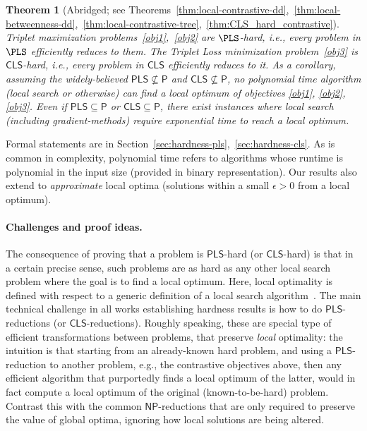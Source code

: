 \documentclass{article}
\theoremstyle{definition}  %
\theoremstyle{plain}
\numberwithin{observation}{section}
\numberwithin{claim}{section}
\numberwithin{fact}{section}
\numberwithin{lemma}{section}
\numberwithin{proposition}{section}
\numberwithin{theorem}{section}
\numberwithin{corollary}{section}
\numberwithin{definition}{section}
\newtheorem*{theorem*}{Theorem}
\newcommand{\CLS}{\mathsf{CLS}}
\theoremstyle{plain}
\begin{document}
\begin{theorem*}[Abridged; see Theorems~\ref{thm:local-contrastive-dd},~\ref{thm:local-betweenness-dd},~\ref{thm:local-contrastive-tree},~\ref{thm:CLS_hard_contrastive}]
Triplet maximization problems~\ref{obj1},~\ref{obj2} are $\PLS$-hard, i.e., every problem in $\PLS$ efficiently reduces to them. The Triplet Loss minimization problem~\ref{obj3} is $\CLS$-hard, i.e., every problem in $\CLS$ efficiently reduces to it. As a corollary, assuming the widely-believed $\mathsf{PLS}\nsubseteq\mathsf{P}$ and $\mathsf{CLS}\nsubseteq \mathsf{P}$, no polynomial time algorithm (local search or otherwise) can find a \textit{local optimum} of  objectives \ref{obj1}, \ref{obj2}, \ref{obj3}. Even if $\mathsf{PLS}\subseteq\mathsf{P}$ or $\mathsf{CLS}\subseteq \mathsf{P}$, there exist instances where local search (including gradient-methods) require exponential time to reach a local optimum. 
\end{theorem*}
   
\vspace{-0.1cm} 
Formal statements are in Section~\ref{sec:hardness-pls},~\ref{sec:hardness-cls}. %
As is common in complexity, polynomial time refers to algorithms whose runtime is polynomial in the input size (provided in binary representation). Our results also extend to \textit{approximate} local optima (solutions within a small $\epsilon>0$ from a local optimum).

\vspace{-0.1cm}
\paragraph{Challenges and proof ideas.} The consequence of proving that a problem is $\mathsf{PLS}$-hard (or $\mathsf{CLS}$-hard) is that in a certain precise sense, such problems are as hard as any other local search problem where the goal is to find a local optimum. Here, local optimality is defined  with respect to a generic definition of a local search algorithm~\citep{johnson1988easy,daskalakis2011continuous}. The main technical challenge in all works establishing hardness results is how to do $\mathsf{PLS}$-reductions (or $\mathsf{CLS}$-reductions). Roughly speaking, these are special type of efficient transformations between problems, that preserve \textit{local} optimality: the intuition is that starting from an already-known hard problem, and using a $\mathsf{PLS}$-reduction to another problem, e.g., the contrastive objectives above, then any efficient algorithm that purportedly finds a local optimum of the latter, would in fact compute a local optimum of the original (known-to-be-hard) problem. Contrast this with the common $\mathsf{NP}$-reductions that are only required to preserve the value of global optima, ignoring how local solutions are being altered. 
\end{document}
